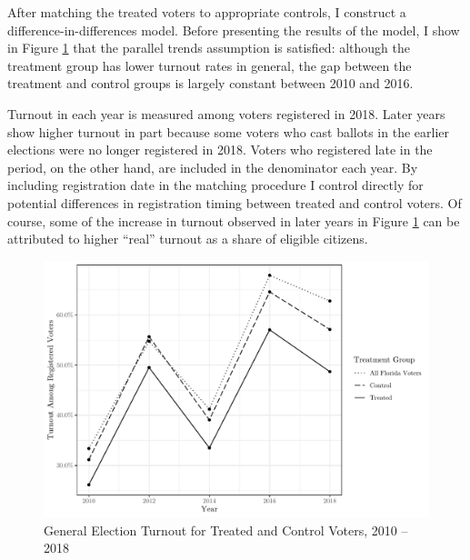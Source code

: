 \documentclass[
  12pt,
]{article}
\begin{document}
After matching the treated voters to appropriate controls, I construct a difference-in-differences model. Before presenting the results of the model, I show in Figure \ref{fig:dind} that the parallel trends assumption is satisfied: although the treatment group has lower turnout rates in general, the gap between the treatment and control groups is largely constant between 2010 and 2016.

Turnout in each year is measured among voters registered in 2018. Later years show higher turnout in part because some voters who cast ballots in the earlier elections were no longer registered in 2018. Voters who registered late in the period, on the other hand, are included in the denominator each year. By including registration date in the matching procedure I control directly for potential differences in registration timing between treated and control voters. Of course, some of the increase in turnout observed in later years in Figure \ref{fig:dind} can be attributed to higher ``real'' turnout as a share of eligible citizens.

\begin{figure}[H]

{\centering \includegraphics{amendment_4_turnout_files/figure-latex/dind-1} 

}

\caption{\label{fig:dind}General Election Turnout for Treated and Control Voters, 2010 -- 2018}\label{fig:dind}
\end{figure}
\end{document}
